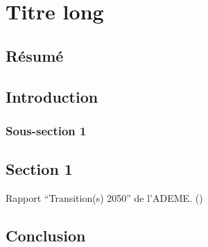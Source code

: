 
\clearforchapter
\chapter[Titre court]{Titre long}\label{cha:2}

\section*{Résumé}

\clearpage
\section{Introduction}

	\subsection{Sous-section 1}


\section{Section 1}

	Rapport \enquote{Transition(s) 2050} de l'\ac{ADEME}. (\cite{ademe_transitions_2021})


\section{Conclusion}

\clearpage
{}
\setcounter{subsection}{1}

